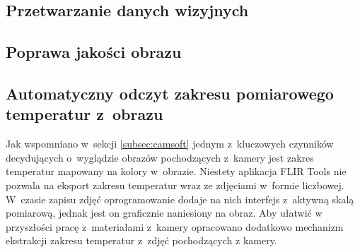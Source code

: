 \subsection{Przetwarzanie danych wizyjnych}

\subsection{Poprawa jakości obrazu}

\subsection{Automatyczny odczyt zakresu pomiarowego temperatur z~obrazu}
Jak wspomniano w~sekcji \ref{subsec:camsoft} jednym z~kluczowych czynników
decydujących o~wyglądzie obrazów pochodzących z~kamery jest zakres temperatur
mapowany na kolory w~obrazie.
Niestety aplikacja FLIR Tools nie pozwala na eksport zakresu temperatur wraz
ze zdjęciami w~formie liczbowej.
W~czasie zapisu zdjęć oprogramowanie dodaje na nich interfejs z~aktywną skalą
pomiarową, jednak jest on graficznie naniesiony na obraz.
Aby ułatwić w przyszłości pracę z~materiałami z~kamery opracowano dodatkowo
mechanizm ekstrakcji zakresu temperatur z~zdjęć pochodzących z kamery.

